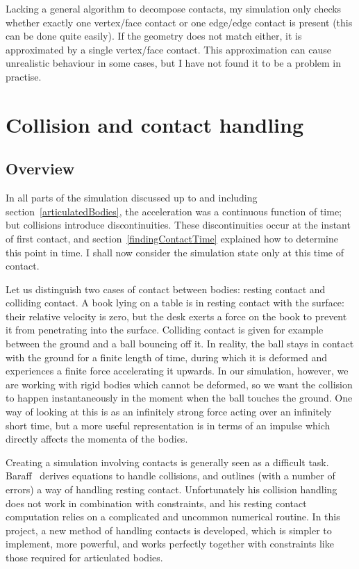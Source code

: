 Lacking a general algorithm to decompose contacts, my simulation only checks whether exactly one
vertex/face contact or one edge/edge contact is present (this can be done quite easily). If the
geometry does not match either, it is approximated by a single vertex/face contact. This
approximation can cause unrealistic behaviour in some cases, but I have not found it to be a
problem in practise.


\section{Collision and contact handling\label{collisionHandling}}

\subsection{Overview}

In all parts of the simulation discussed up to and including section~\ref{articulatedBodies}, the
acceleration was a continuous function of time; but collisions introduce discontinuities. These
discontinuities occur at the instant of first contact, and section~\ref{findingContactTime}
explained how to determine this point in time. I shall now consider the simulation state only at
this time of contact.

Let us distinguish two cases of contact between bodies: resting contact and colliding contact.
A book lying on a table is in resting contact with the surface: their relative velocity is zero,
but the desk exerts a force on the book to prevent it from penetrating into the surface.
Colliding contact is given for example between the ground and a ball bouncing off it. In reality,
the ball stays in contact with the ground for a finite length of time, during which it is
deformed and experiences a finite force accelerating it upwards. In our simulation, however, we
are working with rigid bodies which cannot be deformed, so we want the collision to happen
instantaneously in the moment when the ball touches the ground. One way of looking at this is as
an infinitely strong force acting over an infinitely short time, but a more useful representation
is in terms of an impulse which directly affects the momenta of the bodies.

Creating a simulation involving contacts is generally seen as a difficult task.
Baraff~\cite{BaraffWitkin:97} derives equations to handle collisions, and outlines (with a number
of errors) a way of handling resting contact. Unfortunately his collision handling does not work
in combination with constraints, and his resting contact computation relies on a complicated and
uncommon numerical routine. In this project, a new method of handling contacts is developed, which
is simpler to implement, more powerful, and works perfectly together with constraints like those
required for articulated bodies.


